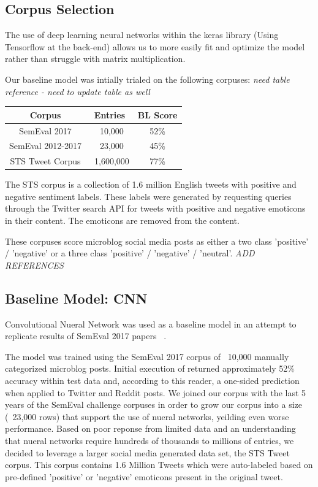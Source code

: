 \documentclass[11pt]{article}
\begin{document}
\subsection{Corpus Selection}
The use of deep learning neural networks within the keras library
(Using Tensorflow at the back-end) allows us to more easily fit and 
optimize the model rather than struggle with matrix multiplication.

Our baseline model was intially trialed on the following corpuses: 
{\em{need table reference - need to update table as well}}

\begin{center}
 \begin{tabular}{||c c c||} 
 \hline
 Corpus & Entries & BL Score \\ [0.5ex] 
 \hline\hline
 SemEval 2017 & ~10,000 & 52\%  \\ 
 \hline
 SemEval 2012-2017 & ~23,000 & 45\%  \\
 \hline
 STS Tweet Corpus & ~1,600,000 & 77\%  \\[1ex] 
 \hline
\end{tabular}
\end{center}

The STS corpus is a collection of 1.6 million English tweets with 
positive and negative sentiment labels. These labels were generated 
by requesting queries through the Twitter search API for tweets with 
positive and negative emoticons in their content. The emoticons are 
removed from the content.

These corpuses score microblog social media posts as either a two class 
'positive' / 'negative' or a three class 'positive' / 'negative' / 'neutral'.
{\em{ADD REFERENCES}}

\subsection{Baseline Model: CNN}

Convolutional Nueral Network was used as a baseline model in an attempt to 
replicate results of SemEval 2017 papers ~\cite{agarwol:11}. 

The model was trained using the SemEval 2017 corpus of ~10,000 manually 
categorized microblog posts. Initial execution of returned approximately 
52\% accuracy within test data and, according to this reader, a one-sided 
prediction when applied to Twitter and Reddit posts. We joined our corpus 
with the last 5 years of the SemEval challenge corpuses in order to grow our 
corpus into a size (~23,000 rows) that support the use of nueral networks, 
yeilding even worse performance. Based on poor reponse from limited data and 
an understanding that nueral networks require hundreds of thousands to millions 
of entries, we decided to leverage a larger social media generated data set, 
the STS Tweet corpus. This corpus contains 1.6 Million Tweets which were 
auto-labeled based on pre-defined 'positive' or 'negative' emoticons present 
in the original tweet. 
\end{document}
